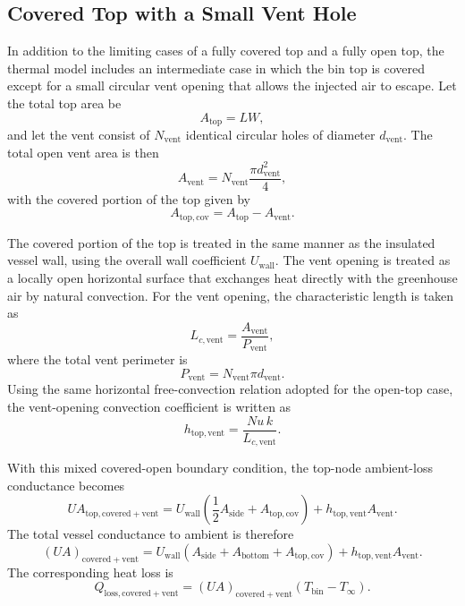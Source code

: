 \subsection{Covered Top with a Small Vent Hole}
In addition to the limiting cases of a fully covered top and a fully open top, the thermal model includes an intermediate case in which the bin top is covered except for a small circular vent opening that allows the injected air to escape. Let the total top area be
\begin{equation}
    A_{\mathrm{top}} = L W,
\end{equation}
and let the vent consist of $N_{\mathrm{vent}}$ identical circular holes of diameter $d_{\mathrm{vent}}$. The total open vent area is then
\begin{equation}
    A_{\mathrm{vent}} = N_{\mathrm{vent}} \frac{\pi d_{\mathrm{vent}}^2}{4},
\end{equation}
with the covered portion of the top given by
\begin{equation}
    A_{\mathrm{top,cov}} = A_{\mathrm{top}} - A_{\mathrm{vent}}.
\end{equation}

The covered portion of the top is treated in the same manner as the insulated vessel wall, using the overall wall coefficient $U_{\mathrm{wall}}$. The vent opening is treated as a locally open horizontal surface that exchanges heat directly with the greenhouse air by natural convection. For the vent opening, the characteristic length is taken as
\begin{equation}
    L_{c,\mathrm{vent}} = \frac{A_{\mathrm{vent}}}{P_{\mathrm{vent}}},
\end{equation}
where the total vent perimeter is
\begin{equation}
    P_{\mathrm{vent}} = N_{\mathrm{vent}} \pi d_{\mathrm{vent}}.
\end{equation}
Using the same horizontal free-convection relation adopted for the open-top case, the vent-opening convection coefficient is written as
\begin{equation}
    h_{\mathrm{top,vent}} = \frac{Nu\,k}{L_{c,\mathrm{vent}}}.
\end{equation}

With this mixed covered-open boundary condition, the top-node ambient-loss conductance becomes
\begin{equation}
    UA_{\mathrm{top,covered+vent}} =
    U_{\mathrm{wall}}\left(\frac{1}{2}A_{\mathrm{side}} + A_{\mathrm{top,cov}}\right)
    + h_{\mathrm{top,vent}} A_{\mathrm{vent}}.
\end{equation}
The total vessel conductance to ambient is therefore
\begin{equation}
    (UA)_{\mathrm{covered+vent}} =
    U_{\mathrm{wall}}\left(A_{\mathrm{side}} + A_{\mathrm{bottom}} + A_{\mathrm{top,cov}}\right)
    + h_{\mathrm{top,vent}} A_{\mathrm{vent}}.
\end{equation}
The corresponding heat loss is
\begin{equation}
    Q_{\mathrm{loss,covered+vent}} =
    (UA)_{\mathrm{covered+vent}} \left(T_{\mathrm{bin}} - T_{\infty}\right).
\end{equation}

